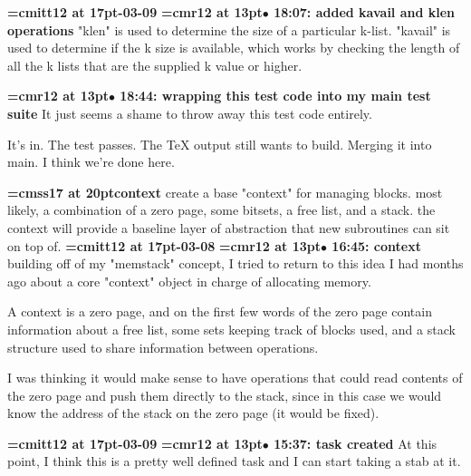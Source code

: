{\medskip\noindent\bf\font\titlefont=cmitt12 at 17pt-03-09}\medskip
{\smallskip\noindent\bf\font\titlefont=cmr12 at 13pt\titlefont $\bullet$ 18:07: added kavail and klen operations}\smallskip
"klen" is used to determine the size of a particular k-list. "kavail" is used to determine if the k size is available, which works by checking the length of all the k lists that are the supplied k value or higher.
\par

{\smallskip\noindent\bf\font\titlefont=cmr12 at 13pt\titlefont $\bullet$ 18:44: wrapping this test code into my main test suite}\smallskip
It just seems a shame to throw away this test code entirely.
\par

It's in. The test passes. The TeX output still wants to build. Merging it into main. I think we're done here.
\par

{\medskip\noindent\bf\font\titlefont=cmss17 at 20pt\titlefont context}\medskip
create a base "context" for managing blocks. most likely,
a combination of a zero page, some bitsets, a free list, and
a stack. the context will provide a baseline layer of abstraction
that new subroutines can sit on top of.
{\medskip\noindent\bf\font\titlefont=cmitt12 at 17pt-03-08}\medskip
{\smallskip\noindent\bf\font\titlefont=cmr12 at 13pt\titlefont $\bullet$ 16:45: context}\smallskip
building off of my "memstack" concept, I tried to return to this idea I had months ago about a core "context" object in charge of allocating memory.
\par

A context is a zero page, and on the first few words of the zero page contain information about a free list, some sets keeping track of blocks used, and a stack structure used to share information between operations.
\par

I was thinking it would make sense to have operations that could read contents of the zero page and push them directly to the stack, since in this case we would know the address of the stack on the zero page (it would be fixed).
\par

{\medskip\noindent\bf\font\titlefont=cmitt12 at 17pt-03-09}\medskip
{\smallskip\noindent\bf\font\titlefont=cmr12 at 13pt\titlefont $\bullet$ 15:37: task created}\smallskip
At this point, I think this is a pretty well defined task and I can start taking a stab at it.
\par

